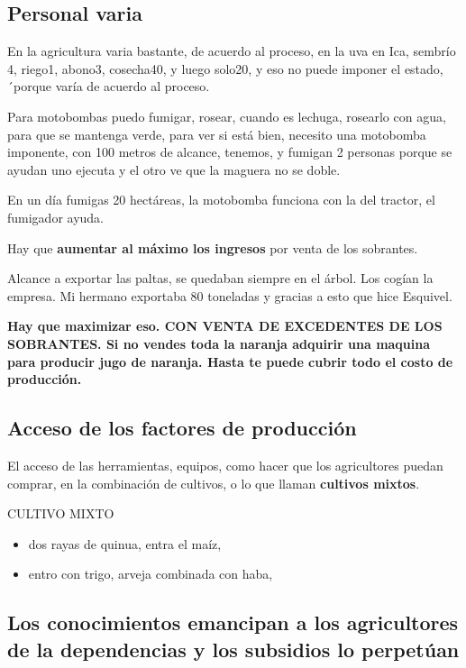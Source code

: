 \documentclass[
  letterpaper,
  DIV=11,
  numbers=noendperiod]{scrartcl}
\begin{document}
\hypertarget{personal-varia}{%
\subsection{Personal varia}\label{personal-varia}}

En la agricultura varia bastante, de acuerdo al proceso, en la uva en
Ica, sembrío 4, riego1, abono3, cosecha40, y luego solo20, y eso no
puede imponer el estado, ´porque varía de acuerdo al proceso.

Para motobombas puedo fumigar, rosear, cuando es lechuga, rosearlo con
agua, para que se mantenga verde, para ver si está bien, necesito una
motobomba imponente, con 100 metros de alcance, tenemos, y fumigan 2
personas porque se ayudan uno ejecuta y el otro ve que la maguera no se
doble.

En un día fumigas 20 hectáreas, la motobomba funciona con la del
tractor, el fumigador ayuda.

Hay que \textbf{aumentar al máximo los ingresos} por venta de los
sobrantes.

Alcance a exportar las paltas, se quedaban siempre en el árbol. Los
cogían la empresa. Mi hermano exportaba 80 toneladas y gracias a esto
que hice Esquivel.

\textbf{Hay que maximizar eso. CON VENTA DE EXCEDENTES DE LOS SOBRANTES.
Si no vendes toda la naranja adquirir una maquina para producir jugo de
naranja. Hasta te puede cubrir todo el costo de producción.}

\hypertarget{acceso-de-los-factores-de-producciuxf3n}{%
\subsection{Acceso de los factores de
producción}\label{acceso-de-los-factores-de-producciuxf3n}}

El acceso de las herramientas, equipos, como hacer que los agricultores
puedan comprar, en la combinación de cultivos, o lo que llaman
\textbf{cultivos mixtos}.

CULTIVO MIXTO

\begin{itemize}
\item
  dos rayas de quinua, entra el maíz,
\item
  entro con trigo, arveja combinada con haba,
\end{itemize}

\hypertarget{los-conocimientos-emancipan-a-los-agricultores-de-la-dependencias-y-los-subsidios-lo-perpetuxfaan}{%
\subsection{Los conocimientos emancipan a los agricultores de la
dependencias y los subsidios lo
perpetúan}\label{los-conocimientos-emancipan-a-los-agricultores-de-la-dependencias-y-los-subsidios-lo-perpetuxfaan}}
\end{document}
